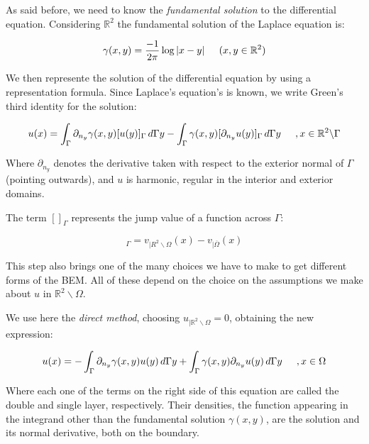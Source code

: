 As said before, we need to know the \textit{fundamental solution} to the differential equation. Considering $\mathbb{R}^{2}$ the fundamental solution of the Laplace equation is:

\begin{equation}
    \gamma (x,y) = \frac{-1}{2\pi} \log |x-y| \hspace{0.2in} (x,y \in \mathbb{R}^{2})
\end{equation}


We then represente the solution of the differential equation by using a representation formula. Since Laplace's equation's is known, we write Green's third identity for the solution:

\begin{equation}\label{eq:green_3id}
    u(x) = \int_{\Gamma} \partial_{n_{y}} \gamma (x,y) [u(y)]_{\Gamma} \,d\Gamma y - \int_{\Gamma} \gamma(x,y) [\partial_{n_{y}}u(y)]_{\Gamma} \,d\Gamma y \hspace{0.2in}, x \in \mathbb{R}^{2} \backslash \Gamma
\end{equation}

Where $\partial_{n_{y}}$ denotes the derivative taken with respect to the exterior normal of $\Gamma$(pointing outwards), and $u$ is harmonic, regular in the interior and exterior domains.

The term $[]_{\Gamma}$ represents the jump value of a function across $\Gamma$:

\begin{equation}
    [v(x)]_{\Gamma} = v_{|R^{2} \backslash \Omega}(x) - v_{|\overline{\Omega}}(x)
\end{equation}

This step also brings one of the many choices we have to make to get different forms of the BEM. All of these depend on the choice on the assumptions we make about $u$ in $\mathbb{R}^{2} \backslash \Omega$.

We use here the \textit{direct method}, choosing $u_{|\mathbb{R}^{2}\backslash \Omega} = 0 $, obtaining the new expression:

\begin{equation}\label{eq:solinit_bem}
    u(x) = - \int_{\Gamma} \partial_{n_{y}} \gamma(x,y) u(y) \,d\Gamma y +  \int_{\Gamma} \gamma(x,y)\partial_{n_{y}} u(y) \,d\Gamma y \hspace{0.2in}, x \in \Omega
\end{equation}

Where each one of the terms on the right side of this equation are called the double and single layer, respectively. Their densities, the function appearing in the integrand other than the fundamental solution $\gamma(x,y)$, are the solution and its normal derivative, both on the boundary.

